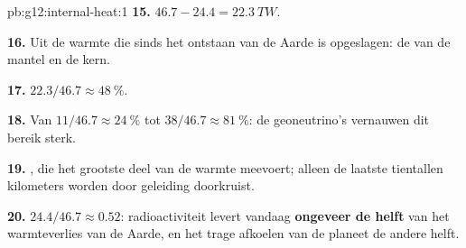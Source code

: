 \begin{solution}{pb:g12:internal-heat:1}
\textbf{15.} $46.7 - 24.4 = \qty{22.3}{TW}$.

\textbf{16.} Uit de warmte die sinds het ontstaan van de Aarde is opgeslagen: de  van de mantel en de kern.

\textbf{17.} $22.3/46.7 \approx \qty{48}{\percent}$.

\textbf{18.} Van $11/46.7 \approx \qty{24}{\percent}$ tot $38/46.7 \approx
\qty{81}{\percent}$: de geoneutrino's vernauwen dit bereik sterk.

\textbf{19.} , die het grootste deel van de warmte meevoert; alleen de laatste
tientallen kilometers worden door geleiding doorkruist.

\textbf{20.} $24.4/46.7 \approx 0.52$: radioactiviteit levert vandaag
\textbf{ongeveer de helft} van het warmteverlies van de Aarde, en het trage afkoelen van
de planeet de andere helft.
\end{solution}
